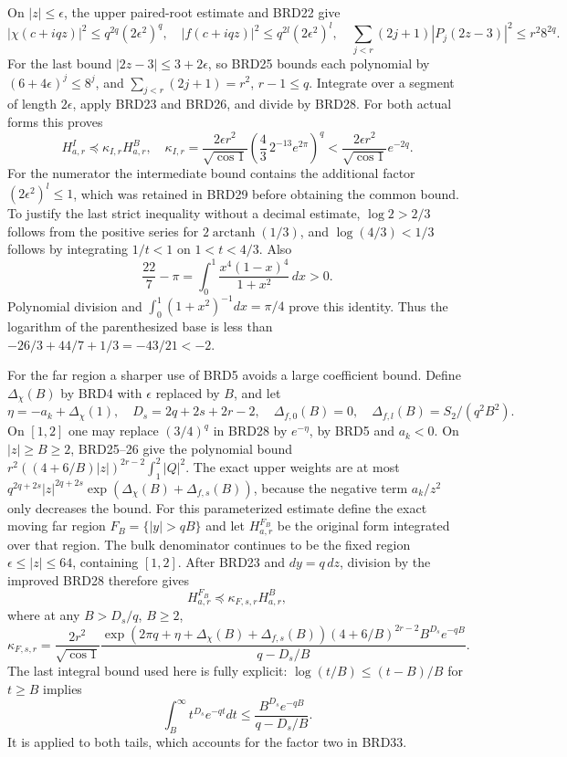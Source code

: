 \documentclass[11pt,a4paper]{article}
\begin{document}
On $|z|\leq\epsilon$, the upper paired-root estimate and BRD22
give
\[
 |\chi(c+iqz)|^2\leq q^{2q}(2\epsilon^2)^q,
 \quad |f(c+iqz)|^2\leq q^{2l}(2\epsilon^2)^l,
 \quad\sum_{j<r}(2j+1)|P_j(2z-3)|^2\leq r^2 8^{2q}.
\tag{BRD29}
\]
For the last bound $|2z-3|\leq3+2\epsilon$, so BRD25 bounds
each polynomial by $(6+4\epsilon)^j\leq8^j$, and
$\sum_{j<r}(2j+1)=r^2$, $r-1\leq q$. Integrate over a
segment of length $2\epsilon$, apply BRD23 and BRD26, and
divide by BRD28. For both actual forms this proves
\[
 H_{a,r}^I\preceq\kappa_{I,r}H_{a,r}^B,
 \quad\kappa_{I,r}=\frac{2\epsilon r^2}{\sqrt{\cos1}}
             \left(\frac43\,2^{-13}e^{2\pi}\right)^q
 <\frac{2\epsilon r^2}{\sqrt{\cos1}}e^{-2q}.
\tag{BRD30}
\]
For the numerator the intermediate bound contains the additional
factor $(2\epsilon^2)^l\leq1$, which was retained in BRD29
before obtaining the common bound. To justify the last strict
inequality without a decimal estimate, $\log2>2/3$ follows
from the positive series for $2\operatorname{arctanh}(1/3)$,
and $\log(4/3)<1/3$ follows by integrating $1/t<1$ on
$1<t<4/3$. Also
\[
 \frac{22}7-\pi=\int_0^1\frac{x^4(1-x)^4}{1+x^2}\,dx>0.
\]
Polynomial division and $\int_0^1(1+x^2)^{-1}dx=\pi/4$
prove this identity. Thus the logarithm of the parenthesized
base is less than $-26/3+44/7+1/3=-43/21<-2$.

For the far region a sharper use of BRD5 avoids a large
coefficient bound. Define $\Delta_\chi(B)$ by BRD4 with
$\epsilon$ replaced by $B$, and let
\[
 \eta=-a_k+\Delta_\chi(1),\quad
 D_s=2q+2s+2r-2,\quad
 \Delta_{f,0}(B)=0,\quad
 \Delta_{f,l}(B)=S_2/(q^2B^2).
\tag{BRD31}
\]
On $[1,2]$ one may replace $(3/4)^q$ in BRD28 by $e^{-\eta}$,
by BRD5 and $a_k<0$. On $|z|\geq B\geq2$, BRD25--26 give
the polynomial bound
$r^2((4+6/B)|z|)^{2r-2}\int_1^2|Q|^2$.
The exact upper weights are at most
$q^{2q+2s}|z|^{2q+2s}
\exp(\Delta_\chi(B)+\Delta_{f,s}(B))$,
because the negative term $a_k/z^2$ only decreases the bound.
For this parameterized estimate define the exact moving far
region $F_B=\{|y|>qB\}$ and let $H_{a,r}^{F_B}$ be the
original form integrated over that region. The bulk denominator
continues to be the fixed region
$\epsilon\leq|z|\leq64$, containing $[1,2]$.
After BRD23 and $dy=q\,dz$, division by the improved BRD28
therefore gives
\[
 H_{a,r}^{F_B}\preceq\kappa_{F,s,r}H_{a,r}^B,
\tag{BRD32}
\]
where at any $B>D_s/q$, $B\geq2$,
\[
 \kappa_{F,s,r}=
 \frac{2r^2}{\sqrt{\cos1}}
 \frac{\exp(2\pi q+\eta+\Delta_\chi(B)+\Delta_{f,s}(B))
 (4+6/B)^{2r-2}B^{D_s}e^{-qB}}{q-D_s/B}.
\tag{BRD33}
\]
The last integral bound used here is fully explicit:
$\log(t/B)\leq(t-B)/B$ for $t\geq B$ implies
\[
 \int_B^\infty t^{D_s}e^{-qt}dt
       \leq\frac{B^{D_s}e^{-qB}}{q-D_s/B}.
\tag{BRD34}
\]
It is applied to both tails, which accounts for the factor two
in BRD33.
\end{document}

